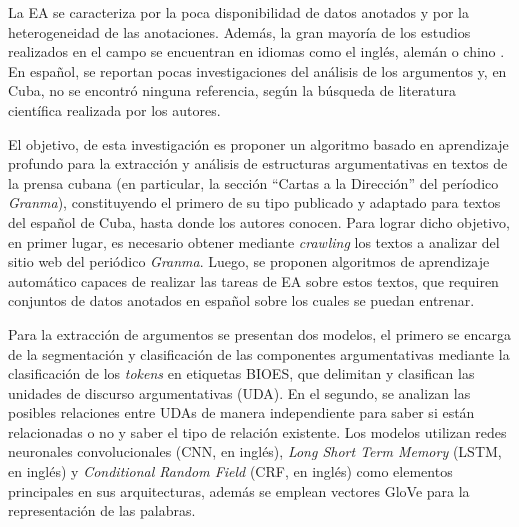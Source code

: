 \documentclass[a4paper,11pt,twocolumn,twoside]{article}
\begin{document}
La EA se caracteriza por la poca disponibilidad de datos anotados y 
por la heterogeneidad de las 
anotaciones. Además, la gran mayoría de los estudios realizados en el campo se encuentran en 
idiomas como el inglés, alemán o chino \cite{eger2018cross}. 
En español, se reportan pocas investigaciones del análisis de los argumentos \cite{esteve2020mineria} y, en 
Cuba, no se encontró ninguna referencia, según la búsqueda de literatura científica
realizada por los autores.



El objetivo, de esta investigación es proponer un algoritmo basado en aprendizaje profundo 
para la extracción y análisis de estructuras argumentativas en textos 
de la prensa cubana (en particular, la sección ``Cartas a la Dirección'' del períodico \textit{Granma}), 
constituyendo el primero de su tipo publicado y adaptado para
textos del español de Cuba, hasta donde los autores conocen. 
Para lograr dicho objetivo, en primer lugar, es necesario obtener mediante \textit{crawling} los textos a analizar del sitio 
web del periódico \textit{Granma}. Luego, se proponen algoritmos de aprendizaje automático capaces de realizar las tareas 
de EA sobre estos textos, que requiren conjuntos 
de datos anotados en español sobre los cuales se puedan entrenar.

Para la extracción
de argumentos se presentan dos modelos, el primero se encarga de la segmentación y clasificación
de las componentes argumentativas mediante la clasificación de los \textit{tokens} en etiquetas BIOES, que %
delimitan y clasifican las unidades de discurso argumentativas (UDA). En el segundo, se analizan 
las posibles relaciones entre UDAs de manera independiente para saber si están relacionadas o no y saber
el tipo de relación existente. Los modelos utilizan 
redes neuronales convolucionales (CNN, en inglés), \textit{Long Short Term Memory} (LSTM, en inglés) \cite{hochreiter1997long} y \textit{Conditional Random Field} (CRF, en inglés) \cite{lafferty2001conditional}
como elementos principales en sus arquitecturas, además se emplean vectores GloVe \cite{pennington2014glove} para la representación
de las palabras. 
\end{document}
